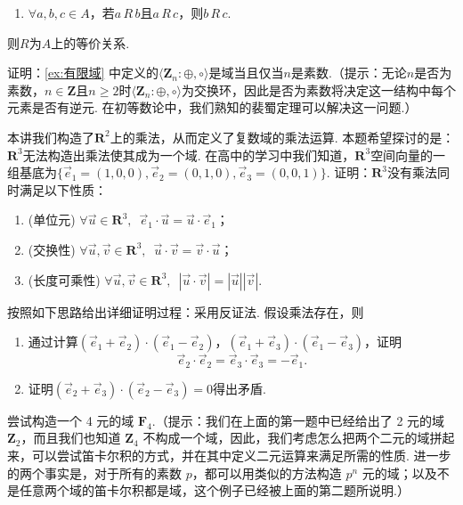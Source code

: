 \begin{exercise}
\begin{exgroup}
\begin{enumerate}
            \item $\forall a,b,c\in A$，若$a\,R\,b$且$a\,R\,c$，则$b\,R\,c$.
        \end{enumerate}
        则$R$为$A$上的等价关系.
    \end{exgroup}

    \begin{exgroup}
        \item 证明：\autoref{ex:有限域} 中定义的$\langle \mathbf{Z}_n\colon\oplus,\circ\rangle$是域当且仅当$n$是素数.（提示：无论$n$是否为素数，$n\in\mathbf{Z}$且$n\geqslant 2$时$\langle \mathbf{Z}_n\colon\oplus,\circ\rangle$为交换环，因此是否为素数将决定这一结构中每个元素是否有逆元. 在初等数论中，我们熟知的裴蜀定理可以解决这一问题.）

        \item 本讲我们构造了$\mathbf{R}^2$上的乘法，从而定义了复数域的乘法运算. 本题希望探讨的是：$\mathbf{R}^3$无法构造出乘法使其成为一个域. 在高中的学习中我们知道，$\mathbf{R}^3$空间向量的一组基底为$\{\vec{e}_1=(1,0,0),\vec{e}_2=(0,1,0),\vec{e}_3=(0,0,1)\}$. 证明：$\mathbf{R}^3$没有乘法同时满足以下性质：
        \begin{enumerate}
            \item (单位元) $\forall \vec{u}\in\mathbf{R}^3,\enspace\vec{e}_1\cdot \vec{u}=\vec{u}\cdot \vec{e}_1$；

            \item (交换性) $\forall \vec{u},\vec{v}\in\mathbf{R}^3,\enspace\vec{u}\cdot \vec{v}=\vec{v}\cdot \vec{u}$；

            \item (长度可乘性) $\forall \vec{u},\vec{v}\in\mathbf{R}^3,\enspace|\vec{u}\cdot\vec{v}|=|\vec{u}||\vec{v}|$.
        \end{enumerate}
        按照如下思路给出详细证明过程：采用反证法. 假设乘法存在，则
        \begin{enumerate}
            \item 通过计算$(\vec{e}_1+\vec{e}_2)\cdot(\vec{e}_1-\vec{e}_2)$，$(\vec{e}_1+\vec{e}_3)\cdot(\vec{e}_1-\vec{e}_3)$，证明\[\vec{e}_2\cdot\vec{e}_2=\vec{e}_3\cdot\vec{e}_3=-\vec{e}_1.\]

            \item 证明$(\vec{e}_2+\vec{e}_3)\cdot(\vec{e}_2-\vec{e}_3)=0$得出矛盾.
        \end{enumerate}

        \item 尝试构造一个 4 元的域 $\mathbf{F}_4$.（提示：我们在上面的第一题中已经给出了 2 元的域 $\mathbf{Z}_2$，而且我们也知道 $\mathbf{Z}_4$ 不构成一个域，因此，我们考虑怎么把两个二元的域拼起来，可以尝试笛卡尔积的方式，并在其中定义二元运算来满足所需的性质. 进一步的两个事实是，对于所有的素数 $p$，都可以用类似的方法构造 $p^n$ 元的域；以及不是任意两个域的笛卡尔积都是域，这个例子已经被上面的第二题所说明.）
    \end{exgroup}
\end{exercise}
